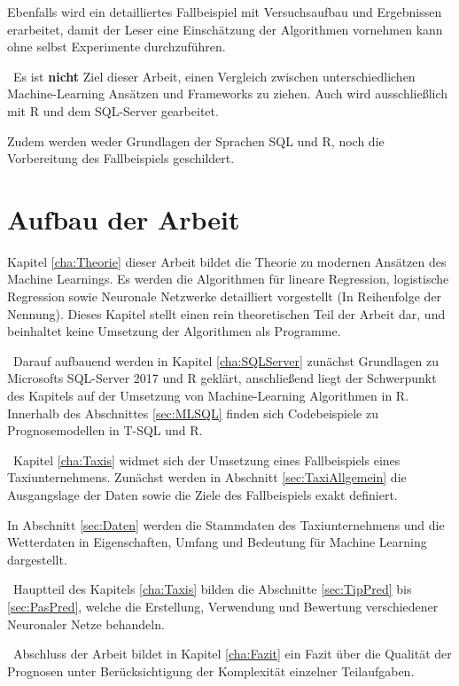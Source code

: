 Ebenfalls wird ein detailliertes Fallbeispiel mit Versuchsaufbau und Ergebnissen erarbeitet, damit der Leser eine Einschätzung der Algorithmen vornehmen kann ohne selbst Experimente durchzuführen.

~\newline Es ist \textbf{nicht} Ziel dieser Arbeit, einen Vergleich zwischen unterschiedlichen Machine-Learning Ansätzen und Frameworks zu ziehen. Auch wird ausschließlich mit R und dem SQL-Server gearbeitet. 

Zudem werden weder Grundlagen der Sprachen SQL und R, noch die Vorbereitung des Fallbeispiels geschildert.

\section{Aufbau der Arbeit}
Kapitel \ref{cha:Theorie} dieser Arbeit bildet die Theorie zu modernen Ansätzen des Machine Learnings. Es werden die Algorithmen für lineare Regression, logistische Regression sowie Neuronale Netzwerke detailliert vorgestellt (In Reihenfolge der Nennung). Dieses Kapitel stellt einen rein theoretischen Teil der Arbeit dar, und beinhaltet keine Umsetzung der Algorithmen als Programme.

~\newline Darauf aufbauend  werden in Kapitel \ref{cha:SQLServer} zunächst Grundlagen zu Microsofts SQL-Server 2017 und R geklärt, anschließend liegt der Schwerpunkt des Kapitels auf der Umsetzung von Machine-Learning Algorithmen in R. Innerhalb des Abschnittes \ref{sec:MLSQL} finden sich Codebeispiele zu Prognosemodellen in T-SQL und R.

~\newline Kapitel \ref{cha:Taxis} widmet sich der Umsetzung eines Fallbeispiels eines Taxiunternehmens. Zunächst werden in Abschnitt \ref{sec:TaxiAllgemein} die Ausgangslage der Daten sowie die Ziele des Fallbeispiels exakt definiert. 

In Abschnitt \ref{sec:Daten} werden die Stammdaten des Taxiunternehmens und die Wetterdaten in Eigenschaften, Umfang und Bedeutung für Machine Learning dargestellt. 

~\newline Hauptteil des Kapitels \ref{cha:Taxis} bilden die Abschnitte \ref{sec:TipPred} bis \ref{sec:PasPred}, welche die Erstellung, Verwendung und Bewertung verschiedener Neuronaler Netze behandeln. 

~\newline Abschluss der Arbeit bildet in Kapitel \ref{cha:Fazit} ein Fazit über die Qualität der Prognosen unter Berücksichtigung der Komplexität einzelner Teilaufgaben.
